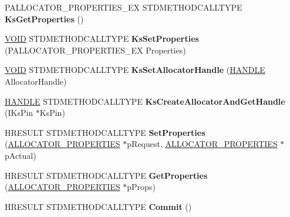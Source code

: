 \begin{DoxyCompactItemize}
\mbox{\label{class_c_ks_allocator_a4d293d731c55e7fb0378c0cf26e35e78}} 
P\+A\+L\+L\+O\+C\+A\+T\+O\+R\+\_\+\+P\+R\+O\+P\+E\+R\+T\+I\+E\+S\+\_\+\+EX S\+T\+D\+M\+E\+T\+H\+O\+D\+C\+A\+L\+L\+T\+Y\+PE {\bfseries Ks\+Get\+Properties} ()
\item 
\mbox{\label{class_c_ks_allocator_ac03945258be7a9617a25e50ca9ffce30}} 
\hyperlink{interfacevoid}{V\+O\+ID} S\+T\+D\+M\+E\+T\+H\+O\+D\+C\+A\+L\+L\+T\+Y\+PE {\bfseries Ks\+Set\+Properties} (P\+A\+L\+L\+O\+C\+A\+T\+O\+R\+\_\+\+P\+R\+O\+P\+E\+R\+T\+I\+E\+S\+\_\+\+EX Properties)
\item 
\mbox{\label{class_c_ks_allocator_a9c98b285f6c69ae813661ef71f801adf}} 
\hyperlink{interfacevoid}{V\+O\+ID} S\+T\+D\+M\+E\+T\+H\+O\+D\+C\+A\+L\+L\+T\+Y\+PE {\bfseries Ks\+Set\+Allocator\+Handle} (\hyperlink{interfacevoid}{H\+A\+N\+D\+LE} Allocator\+Handle)
\item 
\mbox{\label{class_c_ks_allocator_ab9a7fe6dbec37be010cfa521eb328d28}} 
\hyperlink{interfacevoid}{H\+A\+N\+D\+LE} S\+T\+D\+M\+E\+T\+H\+O\+D\+C\+A\+L\+L\+T\+Y\+PE {\bfseries Ks\+Create\+Allocator\+And\+Get\+Handle} (I\+Ks\+Pin $\ast$Ks\+Pin)
\item 
\mbox{\label{class_c_ks_allocator_ac255785232071e777d3f0ef303bc63b8}} 
H\+R\+E\+S\+U\+LT S\+T\+D\+M\+E\+T\+H\+O\+D\+C\+A\+L\+L\+T\+Y\+PE {\bfseries Set\+Properties} (\hyperlink{struct___allocator_properties}{A\+L\+L\+O\+C\+A\+T\+O\+R\+\_\+\+P\+R\+O\+P\+E\+R\+T\+I\+ES} $\ast$p\+Request, \hyperlink{struct___allocator_properties}{A\+L\+L\+O\+C\+A\+T\+O\+R\+\_\+\+P\+R\+O\+P\+E\+R\+T\+I\+ES} $\ast$p\+Actual)
\item 
\mbox{\label{class_c_ks_allocator_a09f54c5d797cc42093b4719f0f49486e}} 
H\+R\+E\+S\+U\+LT S\+T\+D\+M\+E\+T\+H\+O\+D\+C\+A\+L\+L\+T\+Y\+PE {\bfseries Get\+Properties} (\hyperlink{struct___allocator_properties}{A\+L\+L\+O\+C\+A\+T\+O\+R\+\_\+\+P\+R\+O\+P\+E\+R\+T\+I\+ES} $\ast$p\+Props)
\item 
\mbox{\label{class_c_ks_allocator_ae63cd5a4736d5dc1127028d66a9fb189}} 
H\+R\+E\+S\+U\+LT S\+T\+D\+M\+E\+T\+H\+O\+D\+C\+A\+L\+L\+T\+Y\+PE {\bfseries Commit} ()

\end{DoxyCompactItemize}
